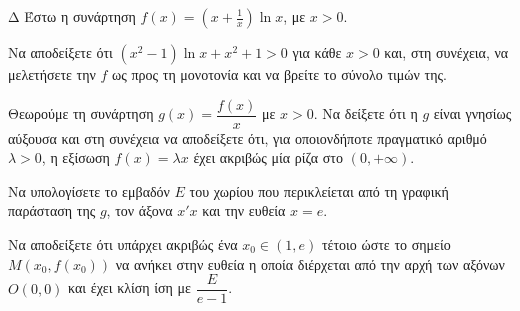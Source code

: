 \begin{thema}{Δ}
Έστω η συνάρτηση $f(x) = \left(x + \frac{1}{x}\right) \ln x$, με $x > 0$.
\begin{erwthma}
    \item Να αποδείξετε ότι $(x^2 - 1)\ln x + x^2 + 1 > 0$ για κάθε $x>0$ και, στη συνέχεια, να μελετήσετε την $f$ ως προς τη μονοτονία και να βρείτε το σύνολο τιμών της.
    \item Θεωρούμε τη συνάρτηση $g(x) = \dfrac{f(x)}{x}$ με $x > 0$. Να δείξετε ότι η $g$ είναι γνησίως αύξουσα και στη συνέχεια να αποδείξετε ότι, για οποιονδήποτε πραγματικό αριθμό $\lambda > 0$, η εξίσωση $f(x) = \lambda x$ έχει ακριβώς μία ρίζα στο $(0, +\infty)$.
    \item Να υπολογίσετε το εμβαδόν $E$ του χωρίου που περικλείεται από τη γραφική παράσταση της $g$, τον άξονα $x'x$ και την ευθεία $x=e$.
    \item Να αποδείξετε ότι υπάρχει ακριβώς ένα $x_0 \in (1, e)$ τέτοιο ώστε το σημείο $M(x_0, f(x_0))$ να ανήκει στην ευθεία η οποία διέρχεται από την αρχή των αξόνων $O(0,0)$ και έχει κλίση ίση με $\dfrac{E}{e-1}$.
\end{erwthma}
\end{thema}
